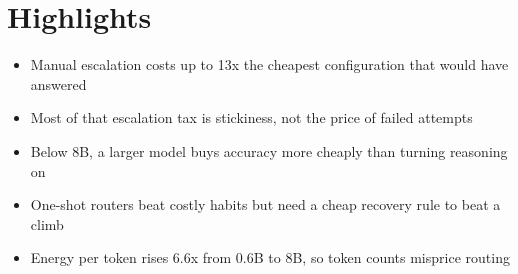 \documentclass[11pt]{article}
\begin{document}
\section*{Highlights}

\begin{itemize}
  \item Manual escalation costs up to 13x the cheapest configuration that
        would have answered
  \item Most of that escalation tax is stickiness, not the price of failed
        attempts
  \item Below 8B, a larger model buys accuracy more cheaply than turning
        reasoning on
  \item One-shot routers beat costly habits but need a cheap recovery rule
        to beat a climb
  \item Energy per token rises 6.6x from 0.6B to 8B, so token counts
        misprice routing
\end{itemize}
\end{document}
